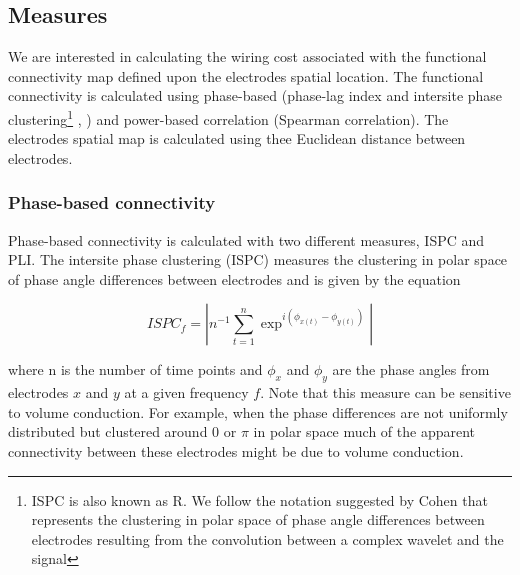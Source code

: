 \documentclass[11pt, onecolumn]{article}
\begin{document}
\subsection{Measures}
We are interested in calculating the wiring cost associated with the functional connectivity map defined upon the electrodes spatial location. The functional connectivity is calculated using phase-based (phase-lag index \citep{stam2007phase} and intersite phase clustering\footnote{ISPC is also known as R. We follow the notation suggested by Cohen \citep{cohen2014analyzing} that represents the clustering in polar space of phase angle differences between electrodes resulting from the convolution between a complex wavelet and the signal} \citep{lachaux1999measuring}, \citep{mormann2000mean}) and power-based correlation (Spearman correlation).
The electrodes spatial map is calculated using thee Euclidean distance between electrodes.

\subsubsection{Phase-based connectivity}
Phase-based connectivity is calculated with two different measures, ISPC and PLI. The intersite phase clustering (ISPC) measures the clustering in polar space of phase angle differences between electrodes and is given by the equation 

\begin{equation}
ISPC_f = | n^{-1} \sum_{t=1}^{n} \exp ^{i(\phi_{x(t)} -\phi_{y(t)})}|
\label{eq:ispc}
\end{equation}

where n is the number of time points and $\phi_x$ and $\phi_y$ are the phase angles from electrodes $x$ and $y$ at a given frequency $f$. Note that this measure can be sensitive to volume conduction. For example, when the phase differences are not uniformly distributed but clustered around 0 or $\pi$ in polar space much of the apparent connectivity between these electrodes might be due to volume conduction.
\end{document}
